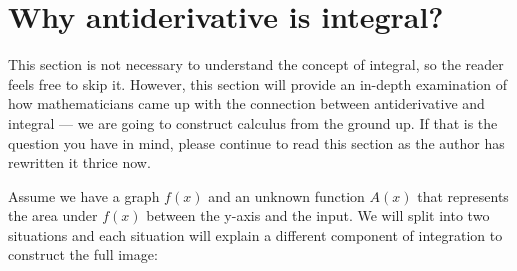 \section{Why antiderivative is integral?}
This section is not necessary to understand the concept of integral, so the reader feels free to skip it. However, this section will provide an in-depth examination of how mathematicians came up with the connection between antiderivative and integral — we are going to construct calculus from the ground up. If that is the question you have in mind, please continue to read this section as the author has rewritten it thrice now.

Assume we have a graph $f(x)$ and an unknown function $A(x)$ that represents the area under $f(x)$ between the y-axis and the input. We will split into two situations and each situation will explain a different component of integration to construct the full image:

